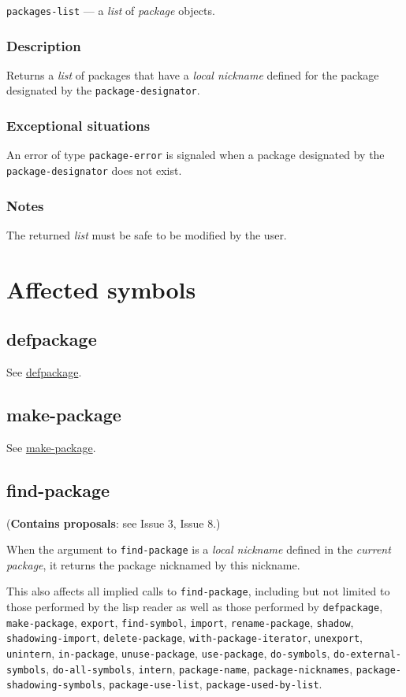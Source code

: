 \documentclass[11pt]{article}
\begin{document}
\texttt{packages-list} --- a \emph{list} of \emph{package} objects.
\subsubsection{Description}
\label{sec:orgb29b47f}
Returns a \emph{list} of packages that have a \emph{local nickname} defined for the package
designated by the \texttt{package-designator}.
\subsubsection{Exceptional situations}
\label{sec:orga2a1f07}
An error of type \texttt{package-error} is signaled when a package designated by the
\texttt{package-designator} does not exist.
\subsubsection{Notes}
\label{sec:org3897f98}
The returned \emph{list} must be safe to be modified by the user.
\section{Affected symbols}
\label{sec:orgaa7116e}
\subsection{defpackage}
\label{sec:org94b3bdb}
See \hyperref[sec:org1f38869]{defpackage}.
\subsection{make-package}
\label{sec:orga8c1e02}
See \hyperref[sec:orgf3a0730]{make-package}.
\subsection{find-package}
\label{sec:org0ed4c47}
(\textbf{Contains proposals}: see Issue 3, Issue 8.)

When the argument to \texttt{find-package} is a \emph{local nickname} defined in the \emph{current
package}, it returns the package nicknamed by this nickname.

This also affects all implied calls to \texttt{find-package}, including but not limited
to those performed by the lisp reader as well as those performed by \texttt{defpackage},
\texttt{make-package}, \texttt{export}, \texttt{find-symbol}, \texttt{import}, \texttt{rename-package}, \texttt{shadow},
\texttt{shadowing-import}, \texttt{delete-package}, \texttt{with-package-iterator}, \texttt{unexport},
\texttt{unintern}, \texttt{in-package}, \texttt{unuse-package}, \texttt{use-package}, \texttt{do-symbols},
\texttt{do-external-symbols}, \texttt{do-all-symbols}, \texttt{intern}, \texttt{package-name},
\texttt{package-nicknames}, \texttt{package-shadowing-symbols}, \texttt{package-use-list},
\texttt{package-used-by-list}.
\end{document}
